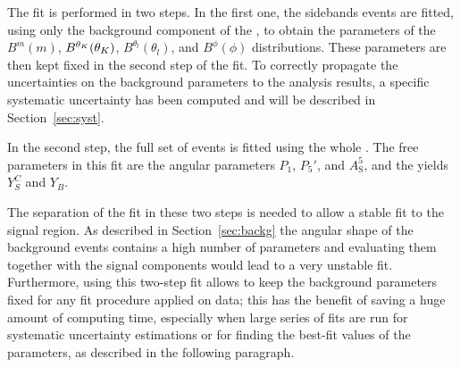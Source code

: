 
The fit is performed in two steps.
In the first one, the sidebands events are fitted, using only the background component of the \pdf, to obtain the parameters of the $B^m(m)$, $B^{\theta_K}(\theta_K)$, $B^{\theta_l}(\theta_l)$, and $B^{\phi}(\phi)$ distributions.
These parameters are then kept fixed in the second step of the fit.
To correctly propagate the uncertainties on the background parameters to the analysis results, a specific systematic uncertainty has been computed and will be described in Section~\ref{sec:syst}.

In the second step, the full set of events is fitted using the whole \pdf.
The free parameters in this fit are the angular parameters $P_1$, $P_5'$, and $A^5_\mathrm{S}$, and the yields $Y^{C}_{S}$ and $Y_{B}$.

The separation of the fit in these two steps is needed to allow a stable fit to the signal region.
As described in Section~\ref{sec:backg} the angular shape of the background events contains a high number of parameters and evaluating them together with the signal components would lead to a very unstable fit.
Furthermore, using this two-step fit allows to keep the background parameters fixed for any fit procedure applied on data; this has the benefit of saving a huge amount of computing time, especially when large series of fits are run for systematic uncertainty estimations or for finding the best-fit values of the parameters, as described in the following paragraph.

